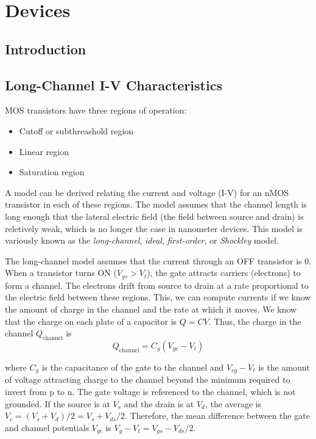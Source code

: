 \section{Devices}
\subsection{Introduction}

\subsection{Long-Channel I-V Characteristics}
MOS transistors have three regions of operation:
\begin{itemize}
    \item Cutoff or subthreashold region
    \item Linear region
    \item Saturation region
\end{itemize}

A model can be derived relating the current and voltage (I-V) for an nMOS transistor in each of these regions. The model assumes that the 
channel length is long enough that the lateral electric field (the field between source and drain) is reletively weak, which is no longer the case in nanometer devices.
This model is variously known as the \textit{long-channel}, \textit{ideal}, \textit{first-order}, or \textit{Shockley} model.  

The long-channel model assumes that the current through an OFF transistor is 0.
When a transistor turns ON ($V_{gs} > V_t$), the gate attracts carriers (electrons) to form a channel. The electrons drift from source 
to drain at a rate proportional to the electric field between these regions. This, we can compute currents if we know the amount of charge in the channel and 
the rate at which it moves. We know that the charge on each plate of a capacitor is $Q = CV$. Thus, the charge in the channel $Q_{\text{channel}}$ is 
\begin{equation}
    Q_{\text{channel}} = C_g \left(V_{gc} - V_t\right)
\end{equation}

where $C_g$ is the capacitance of the gate to the channel and $V_{cg} - V_t$ is the amount of voltage attracting charge to the channel beyond the minimum 
required to invert from p to n. The gate voltage is referenced to the channel, which is not grounded. If the source is at $V_s$ and the drain is at $V_d$, 
the average is $V_c = (V_s + V_d)/2 = V_s + V_{ds} / 2$. Therefore, the mean difference between the gate and channel potentials $V_{gc}$ is $V_g - V_t = V_{gs} - V_{ds}/2$.

